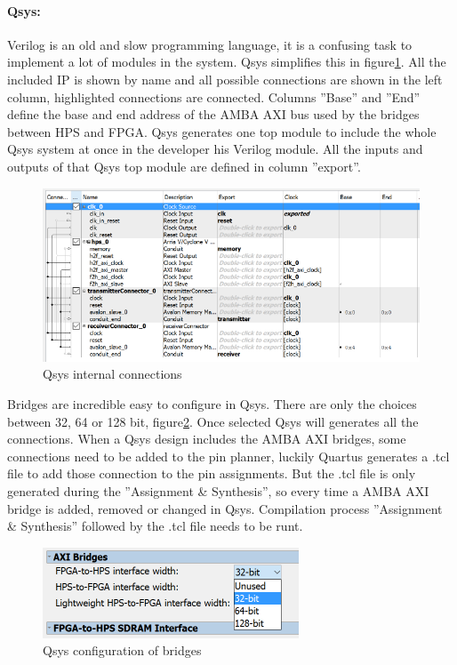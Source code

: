 \documentclass[12pt,a4paper,english,twoside,openright]{tutthesis}
\begin{document}
				\paragraph{Qsys:	}
Verilog is an old and slow programming language, it is a confusing task to implement a lot of modules in the system. Qsys simplifies this in figure\ref{fig:QsysConnections}. All the included IP is shown by name and all possible connections are shown in the left column, highlighted connections are connected. Columns ''Base'' and ''End'' define the base and end address of the AMBA AXI bus used by the bridges between HPS and FPGA. Qsys generates one top module to include the whole Qsys system at once in the developer his Verilog module. All the inputs and outputs of that Qsys top module are defined in column ''export''.
\begin{figure}
	\centering
	\includegraphics[scale=0.6]{images/QsysInternalConnections.png}
	\caption{Qsys internal connections}
	\label{fig:QsysConnections}
\end{figure}
Bridges are incredible easy to configure in Qsys. There are only the choices between 32, 64 or 128 bit, figure\ref{fig:QsysBridgeConfig}. Once selected Qsys will generates all the connections. When a Qsys design includes the AMBA AXI bridges, some connections need to be added to the pin planner, luckily Quartus generates a .tcl file to add those connection to the pin assignments. But the .tcl file is only generated during the ''Assignment \& Synthesis'', so every time a AMBA AXI bridge is added, removed or changed in Qsys. Compilation process ''Assignment \& Synthesis'' followed by the .tcl file needs to be runt.
\begin{figure}
	\centering
	\includegraphics[scale=0.6]{images/QsysBridgeConfiguration.png}
	\caption{Qsys configuration of bridges}
	\label{fig:QsysBridgeConfig}
\end{figure}
\end{document}
